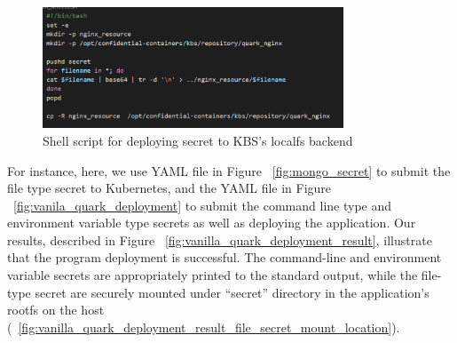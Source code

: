 \begin{figure}[H]
    \centering
    \includegraphics[width=0.8\textwidth]{images/kbs_secret_deployment.png}
    \caption[Shell script for deploying secret to KBS’s localfs backend]{Shell script for deploying secret to KBS’s localfs backend}
    \label{fig:kbs_secret_deployment}
\end{figure}

For instance, here, we use YAML file in Figure ~\ref{fig:mongo_secret} to submit the file type secret to Kubernetes, and the YAML file in Figure  ~\ref{fig:vanila_quark_deployment} to submit the command line type and environment variable type secrets as well as deploying the application. 
Our results, described in Figure ~\ref{fig:vanilla_quark_deployment_result}, illustrate that the program deployment is successful.  The command-line and environment variable secrets are appropriately printed to the standard output, while the file-type secret are securely mounted under  
“secret” directory in the application’s rootfs on the host (~\ref{fig:vanilla_quark_deployment_result_file_secret_mount_location}). 

